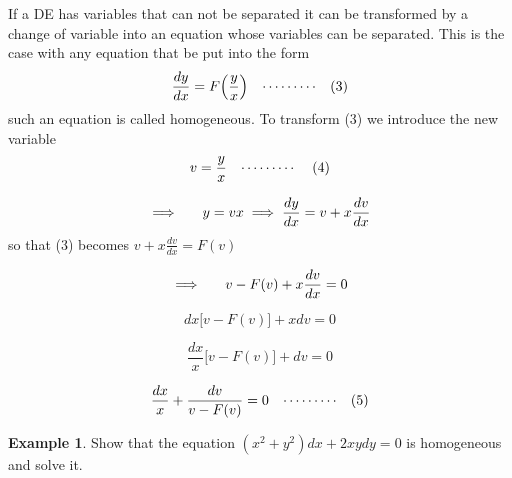 \documentclass[11pt,a4paper]{article}
\theoremstyle{definition}
\newtheorem{exa}[thm]{Example}
\begin{document}
If a DE has  variables that can not be separated it can be transformed by a change of variable into an equation whose variables can be separated. This is the case with any equation that be put into the form $$\frac{dy}{dx} = F\Big(\dfrac{y}{x}\Big)\hspace{0.3cm}\cdots\cdots\cdots\hspace{0.3cm} (3)$$ such an equation is called homogeneous. To transform (3) we introduce the new variable $$ v = \frac{y}{x}\hspace{0.3cm}\cdots\cdots\cdots\hspace{0.4cm} (4)$$

$$\implies \hspace{0.5cm} y = vx \implies \frac{dy}{dx} = v + x\frac{dv}{dx}$$ so that (3) becomes $\displaystyle{v + x\frac{dv}{dx} = F(v)}$

$$\implies\hspace{0.5cm} v - F(v) + x\frac{dv}{dx} = 0$$

$$dx\big[v - F(v)\big] + xdv = 0$$

$$\frac{dx}{x}\big[v - F(v)\big] + dv = 0$$

$$\frac{dx}{x} + \frac{dv}{v - F(v)} = 0 \hspace{0.3cm} \cdots\cdots\cdots\hspace{0.3cm} (5)$$


\begin{exa}


Show that the equation $(x^2 + y^2)dx + 2xydy = 0$ is homogeneous and solve it.
\end{exa}
\end{document}
